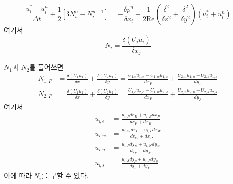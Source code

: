 \documentclass[a4paper, 10pt]{article}
\renewcommand{\Re}{\mathrm{Re}}
\begin{document}
\begin{equation} \label{eq:substep}
    \frac{u_i^* - u_i^n}{\Delta t} + \frac{1}{2} [3N_i^n - N_i^{n-1}]
    = -\frac{\delta p^n}{\delta x_i} + \frac{1}{2\Re} \left( \frac{\delta^2}{\delta x^2} + \frac{\delta^2}{\delta y^2} \right) (u_i^* + u_i^n)
\end{equation}
여기서
\begin{equation}
    N_i = \frac{\delta (U_j u_i)}{\delta x_j}
\end{equation}

$N_1$과 $N_2$를 풀어쓰면
\begin{align}
    N_{1,P} &= \frac{\delta (U_1 u_1)}{\delta x} + \frac{\delta (U_2 u_1)}{\delta y}
    = \frac{U_{1,e}u_{1,e} - U_{1,w}u_{1,w}}{dx_P} + \frac{U_{2,n}u_{1,n} - U_{2,s}u_{1,s}}{dy_P} \\
    N_{2,P} &= \frac{\delta (U_1 u_2)}{\delta x} + \frac{\delta (U_2 u_2)}{\delta y}
    = \frac{U_{1,e}u_{2,e} - U_{1,w}u_{2,w}}{dx_P} + \frac{U_{2,n}u_{2,n} - U_{2,s}u_{2,s}}{dy_P}
\end{align}
여기서
\begin{subequations}
\begin{align}
    u_{i,e} &= \frac{u_{i,P}dx_E + u_{i,E}dx_P}{dx_P + dx_E} \\
    u_{i,w} &= \frac{u_{i,W}dx_P + u_{i,P}dx_W}{dx_W + dx_P} \\
    u_{i,n} &= \frac{u_{i,P}dy_N + u_{i,N}dy_P}{dy_P + dy_N} \\
    u_{i,s} &= \frac{u_{i,S}dy_P + u_{i,P}dy_S}{dy_S + dy_P}
\end{align}
\end{subequations}
이에 따라 $N_i$를 구할 수 있다.
\end{document}
